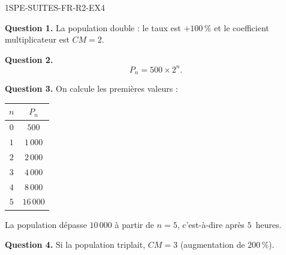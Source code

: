 
\begin{corrige}{1SPE-SUITES-FR-R2-EX4}


\textbf{Question 1.} La population double : le taux est $+100\,\%$ et le coefficient multiplicateur est $CM = 2$.

\textbf{Question 2.}
\[
P_n = 500 \times 2^n.
\]

\textbf{Question 3.} On calcule les premières valeurs :

\begin{center}
\begin{tabular}{|c|c|}
\hline
$n$ & $P_n$ \\
\hline
$0$ & $500$ \\
$1$ & $1\,000$ \\
$2$ & $2\,000$ \\
$3$ & $4\,000$ \\
$4$ & $8\,000$ \\
$5$ & $16\,000$ \\
\hline
\end{tabular}
\end{center}

La population dépasse $10\,000$ à partir de $n = 5$, c'est-à-dire après $5$~heures.

\textbf{Question 4.} Si la population triplait, $CM = 3$ (augmentation de $200\,\%$).

\end{corrige}
